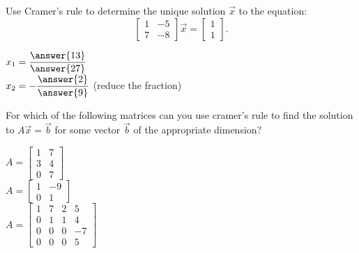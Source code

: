 \documentclass{ximera}
\begin{document}
      \begin{question} Use Cramer's rule to determine the unique solution $\vec{x}$ to the equation: $$\begin{bmatrix} 1 & -5 \\ 7& -8 \end{bmatrix}\vec{x} = \begin{bmatrix} 1\\1\end{bmatrix}.$$
      	
      	$x_1=\dfrac{\answer{13}}{\answer{27}}$\vspace{10pt}\\
      	$x_2=-\dfrac{\answer{2}}{\answer{9}}$ (reduce the fraction)\vspace{10pt}\\
      	
      	
      	
      	
      \end{question}	
       \begin{question} For which of the following matrices can you use cramer's rule to find the solution to $A\vec{x} = \vec{b}$ for some vector $\vec{b}$ of the appropriate dimension? 
       	
       	\begin{multipleChoice}
       		\choice $A = \begin{bmatrix} 1 &7\\ 3& 4\\ 0&7\end{bmatrix}$ \vspace{5pt}\\
       			\choice[correct] $A = \begin{bmatrix} 1 &-9\\ 0& 1\end{bmatrix}$ \vspace{5pt}\\
       			\choice $A = \begin{bmatrix} 1 &7&2&5\\ 0&1&1& 4\\ 0&0&0&-7\\0&0&0&5\end{bmatrix}$ \vspace{5pt}\\
       		\end{multipleChoice}
       	
       	
     
       \end{question}	
\end{document}
